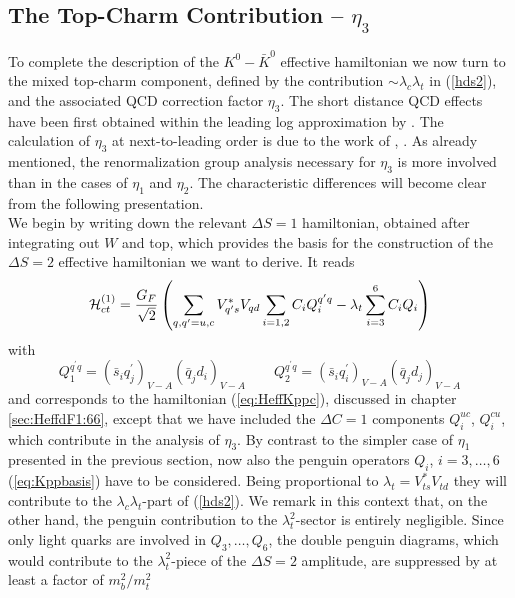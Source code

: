 \subsection{The Top-Charm Contribution -- $\eta_3$}
\label{sec:HeffKKbar:eta3}
To complete the description of the $K^0-\bar K^0$ effective hamiltonian we
now turn to the mixed top-charm component, defined by the contribution
$\sim\lambda_c\lambda_t$ in (\ref{hds2}), and the associated QCD
correction factor $\eta_3$. The short distance QCD effects have been
first obtained within the leading log approximation by
\cite{gilmanwise:83}. The calculation of $\eta_3$ at next-to-leading
order is due to the work of \cite{herrlichnierste:95},
\cite{nierste:95}. As already mentioned, the renormalization group
analysis necessary for $\eta_3$ is more involved than in the cases of
$\eta_1$ and $\eta_2$. The characteristic differences will become clear
from the following presentation.
\\
We begin by writing down the relevant $\Delta S=1$ hamiltonian,
obtained after integrating out $W$ and top, which provides the basis
for the construction of the $\Delta S=2$ effective hamiltonian we want
to derive. It reads
\begin{equation}\label{hct1}
{\cal H}^{(1)}_{ct}=\frac{G_F}{\sqrt 2}\left(\sum_{q, q^\prime=u, c}
 V^\ast_{q^\prime s}V_{qd}\sum_{i=1,2}C_iQ^{q^\prime q}_i -
 \lambda_t\sum_{i=3}^6 C_i Q_i \right)
\end{equation}
with
\begin{equation}\label{qpq12}
Q^{q^\prime q}_1=(\bar s_iq^\prime_j)_{V-A}(\bar q_jd_i)_{V-A} \qquad
Q^{q^\prime q}_2=(\bar s_iq^\prime_i)_{V-A}(\bar q_jd_j)_{V-A}
\end{equation}
and corresponds to the hamiltonian (\ref{eq:HeffKppc}), discussed in
chapter \ref{sec:HeffdF1:66}, except that we have included the
$\Delta C=1$ components $Q^{uc}_i$, $Q^{cu}_i$, which contribute in the
analysis of $\eta_3$.
By contrast to the simpler case of $\eta_1$ presented in the previous
section, now also the penguin operators $Q_i$, $i=3,\ldots, 6$
(\ref{eq:Kppbasis}) have to be considered. Being proportional to
$\lambda_t=V^\ast_{ts}V_{td}$ they will contribute to the
$\lambda_c\lambda_t$-part of (\ref{hds2}). We remark in this context
that, on the other hand, the penguin contribution to the 
$\lambda^2_t$-sector is entirely negligible. Since only light quarks
are involved in $Q_3,\ldots ,Q_6$, the double penguin diagrams, which 
would contribute to the $\lambda^2_t$-piece of the $\Delta S=2$
amplitude, are suppressed by at least a factor of $m^2_b/m^2_t$
